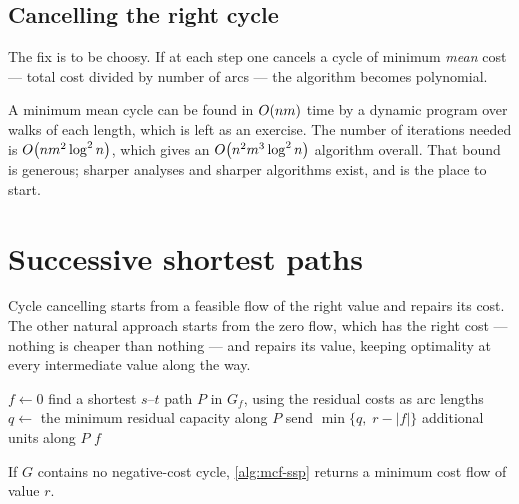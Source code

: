 \subsection{Cancelling the right cycle}

The fix is to be choosy. If at each step one cancels a cycle of minimum
\emph{mean} cost --- total cost divided by number of arcs --- the algorithm
becomes polynomial.

A minimum mean cycle can be found in $O\!\left(nm\right)$ time by a dynamic program
over walks of each length, which is left as an exercise. The number of
iterations needed is $O\!\left(nm^2\log^2 n\right)$, which gives an
$O\!\left(n^2m^3\log^2 n\right)$ algorithm overall. That bound is generous; sharper
analyses and sharper algorithms exist, and \citet{GoldbergTarjan1989} is the
place to start.

\section{Successive shortest paths}
\label{sec:mcf-successive-shortest-paths}

Cycle cancelling starts from a feasible flow of the right value and repairs its
cost. The other natural approach starts from the zero flow, which has the right
cost --- nothing is cheaper than nothing --- and repairs its value, keeping
optimality at every intermediate value along the way.

\begin{algorithm}[ht]
\caption{Successive shortest paths}
\label{alg:mcf-ssp}
\begin{algorithmic}[1]
  \State $f \gets 0$
     \State find a shortest $s$--$t$ path $P$ in $G_f$, using the residual
            costs as arc lengths
     \State $q \gets$ the minimum residual capacity along $P$
     \State send $\min\{q,\; r - |f|\}$ additional units along $P$
  \EndWhile
  \State \Return $f$
\end{algorithmic}
\end{algorithm}

\begin{theorem}\label{thm:mcf-ssp}
If $G$ contains no negative-cost cycle, \cref{alg:mcf-ssp} returns a minimum
cost flow of value $r$.
\end{theorem}

